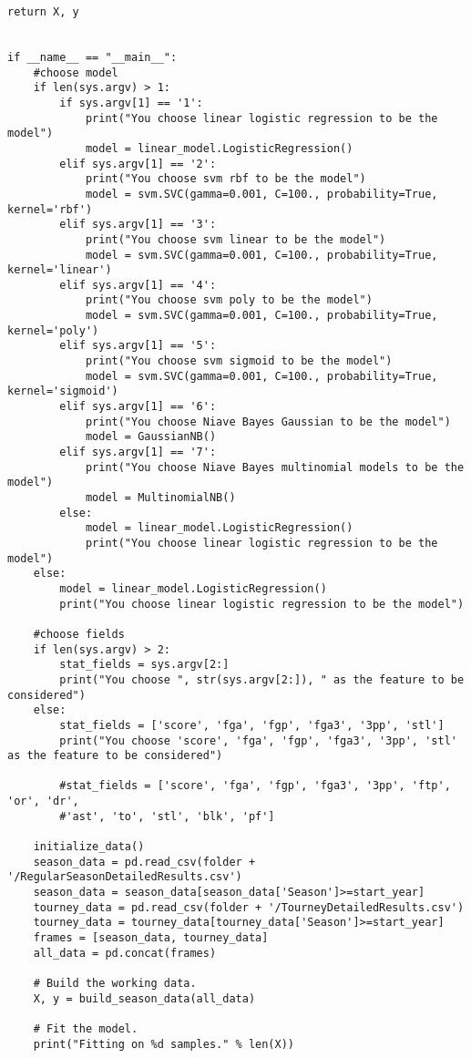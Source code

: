 \documentclass[onecolumn, draftclsnofoot,10pt, compsoc]{IEEEtran}
\begin{document}
\begin{lstlisting}[caption={mm.py, where basketball statistics are read and fed into Scikit-Learn machine learning algorithms. Then, the resulting March Madness bracket is generated.}]
    return X, y


if __name__ == "__main__":
	#choose model
    if len(sys.argv) > 1:
    	if sys.argv[1] == '1':
    		print("You choose linear logistic regression to be the model")
    		model = linear_model.LogisticRegression()
    	elif sys.argv[1] == '2':
    		print("You choose svm rbf to be the model")
    		model = svm.SVC(gamma=0.001, C=100., probability=True, kernel='rbf')
    	elif sys.argv[1] == '3':
    		print("You choose svm linear to be the model")
    		model = svm.SVC(gamma=0.001, C=100., probability=True, kernel='linear')
    	elif sys.argv[1] == '4':
    		print("You choose svm poly to be the model")
    		model = svm.SVC(gamma=0.001, C=100., probability=True, kernel='poly')
    	elif sys.argv[1] == '5':
    		print("You choose svm sigmoid to be the model")
    		model = svm.SVC(gamma=0.001, C=100., probability=True, kernel='sigmoid')
        elif sys.argv[1] == '6':
            print("You choose Niave Bayes Gaussian to be the model")
            model = GaussianNB()
        elif sys.argv[1] == '7':
            print("You choose Niave Bayes multinomial models to be the model")
            model = MultinomialNB()
        else:
            model = linear_model.LogisticRegression()
            print("You choose linear logistic regression to be the model")  
    else:
    	model = linear_model.LogisticRegression()
    	print("You choose linear logistic regression to be the model")
    
    #choose fields
    if len(sys.argv) > 2:
    	stat_fields = sys.argv[2:]
    	print("You choose ", str(sys.argv[2:]), " as the feature to be considered")
    else:
    	stat_fields = ['score', 'fga', 'fgp', 'fga3', '3pp', 'stl']
    	print("You choose 'score', 'fga', 'fgp', 'fga3', '3pp', 'stl' as the feature to be considered")

    	#stat_fields = ['score', 'fga', 'fgp', 'fga3', '3pp', 'ftp', 'or', 'dr',
    	#'ast', 'to', 'stl', 'blk', 'pf']

    initialize_data()
    season_data = pd.read_csv(folder + '/RegularSeasonDetailedResults.csv')
    season_data = season_data[season_data['Season']>=start_year]
    tourney_data = pd.read_csv(folder + '/TourneyDetailedResults.csv')
    tourney_data = tourney_data[tourney_data['Season']>=start_year]
    frames = [season_data, tourney_data]
    all_data = pd.concat(frames)

    # Build the working data.
    X, y = build_season_data(all_data)

    # Fit the model.
    print("Fitting on %d samples." % len(X))


\end{lstlisting}
\end{document}
